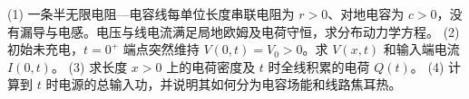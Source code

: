 (1) 一条半无限电阻—电容线每单位长度串联电阻为 \(r>0\)、对地电容为 \(c>0\)，没有漏导与电感。电压与线电流满足局地欧姆及电荷守恒，求分布动力学方程。
(2) 初始未充电，\(t=0^+\) 端点突然维持 \(V(0,t)=V_0>0\)。求 \(V(x,t)\) 和输入端电流 \(I(0,t)\)。
(3) 求长度 \(x>0\) 上的电荷密度及 \(t\) 时全线积累的电荷 \(Q(t)\)。
(4) 计算到 \(t\) 时电源的总输入功，并说明其如何分为电容场能和线路焦耳热。
